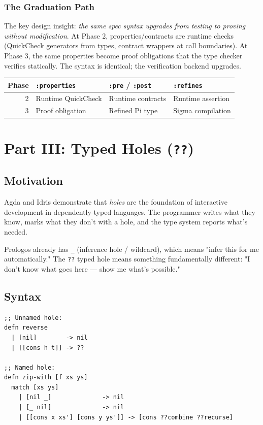 \documentclass[11pt]{article}
\begin{document}
\subsubsection{The Graduation Path}
\label{sec:orge6b6e58}

The key design insight: \emph{the same spec syntax upgrades from testing to proving
without modification}. At Phase 2, properties/contracts are runtime checks
(QuickCheck generators from types, contract wrappers at call boundaries). At
Phase 3, the same properties become proof obligations that the type checker
verifies statically. The syntax is identical; the verification backend upgrades.

\begin{center}
\begin{tabular}{rlll}
Phase & \texttt{:properties} & \texttt{:pre} / \texttt{:post} & \texttt{:refines}\\
\hline
2 & Runtime QuickCheck & Runtime contracts & Runtime assertion\\
3 & Proof obligation & Refined Pi type & Sigma compilation\\
\end{tabular}
\end{center}
\section{Part III: Typed Holes (\texttt{??})}
\label{sec:orga27a4ca}

\subsection{Motivation}
\label{sec:org8ee21f8}

Agda and Idris demonstrate that \emph{holes} are the foundation of interactive
development in dependently-typed languages. The programmer writes what they know,
marks what they don't with a hole, and the type system reports what's needed.

Prologos already has \texttt{\_} (inference hole / wildcard), which means "infer this
for me automatically." The \texttt{??} typed hole means something fundamentally
different: "I don't know what goes here --- show me what's possible."
\subsection{Syntax}
\label{sec:org9947416}

\begin{verbatim}
;; Unnamed hole:
defn reverse
  | [nil]        -> nil
  | [[cons h t]] -> ??

;; Named hole:
defn zip-with [f xs ys]
  match [xs ys]
    | [nil _]              -> nil
    | [_ nil]              -> nil
    | [[cons x xs'] [cons y ys']] -> [cons ??combine ??recurse]
\end{verbatim}
\end{document}
